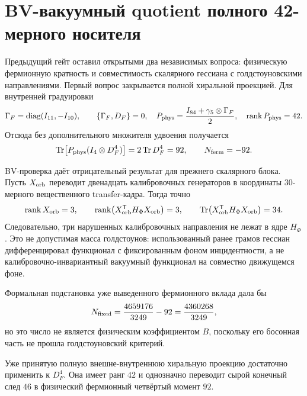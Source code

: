 \chapter{BV-вакуумный quotient полного 42-мерного носителя}
\label{ch:v8-full-42-carrier-bv-vacuum-quotient-gate}

Предыдущий гейт оставил открытыми два независимых вопроса: физическую
фермионную кратность и совместимость скалярного гессиана с
голдстоуновскими направлениями. Первый вопрос закрывается полной
хиральной проекцией. Для внутренней градуировки
\begin{equation}
 \Gamma_F=\operatorname{diag}(I_{11},-I_{10}),\qquad
 \{\Gamma_F,D_F\}=0,
 \quad
 P_{\rm phys}=\frac{I_{84}+\gamma_5\otimes\Gamma_F}{2},
 \quad \operatorname{rank} P_{\rm phys}=42.
 \label{eq:v8-full-carrier-physical-chiral-projector}
\end{equation}
Отсюда без дополнительного множителя удвоения получается
\begin{equation}
 \operatorname{Tr}\!\left[P_{\rm phys}(I_4\otimes D_F^4)\right]
 =2\operatorname{Tr} D_F^4=92,
 \qquad N_{\rm ferm}=-92.
 \label{eq:v8-full-carrier-fermion-multiplicity}
\end{equation}

BV-проверка даёт отрицательный результат для прежнего скалярного блока.
Пусть $X_{\rm orb}$ переводит двенадцать калибровочных генераторов в
координаты 30-мерного вещественного transfer-кадра. Тогда точно
\begin{equation}
 \operatorname{rank} X_{\rm orb}=3,
 \qquad
 \operatorname{rank}\!\left(X_{\rm orb}^{\mathsf T}H_{\Phi}X_{\rm orb}\right)=3,
 \qquad
 \operatorname{Tr}\!\left(X_{\rm orb}^{\mathsf T}H_{\Phi}X_{\rm orb}\right)=34.
 \label{eq:v8-full-carrier-goldstone-failure}
\end{equation}
Следовательно, три нарушенных калибровочных направления не лежат в ядре
$H_{\Phi}$. Это не допустимая масса голдстоунов: использованный ранее
грамов гессиан дифференцировал функционал с фиксированным фоном
инцидентности, а не калибровочно-инвариантный вакуумный функционал на
совместно движущемся фоне.

Формальная подстановка уже выведенного фермионного вклада дала бы
\begin{equation}
 N_{\rm fixed}=\frac{4659176}{3249}-92
 =\frac{4360268}{3249},
 \label{eq:v8-full-carrier-fixed-background-candidate}
\end{equation}
но это число не является физическим коэффициентом $B$, поскольку его
босонная часть не прошла голдстоуновский критерий.

\begin{theorem}
Уже принятую полную внешне-внутреннюю хиральную проекцию достаточно
применить к $D_F^4$. Она имеет ранг $42$ и однозначно переводит сырой
конечный след $46$ в физический фермионный четвёртый момент $92$.
\end{theorem}

